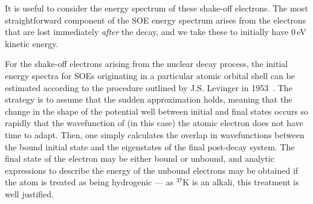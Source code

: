 It is useful to consider the energy spectrum of these shake-off electrons.  The most straightforward component of the SOE energy spectrum arises from the electrons that are lost immediately \emph{after} the decay, and we take these to initially have 0\,eV kinetic energy.  

For the shake-off electrons arising from the nuclear decay process, the initial energy spectra for SOEs originating in a particular atomic orbital shell can be estimated according to the procedure outlined by J.S. Levinger in 1953~\cite{Levinger}.
%
The strategy is to assume that the sudden approximation holds, meaning that the change in the shape of the potential well between initial and final states occurs so rapidly that the wavefunction of (in this case) the atomic electron does not have time to adapt.  Then, one simply calculates the overlap in wavefunctions between the bound initial state and the eigenstates of the final post-decay system.  The final state of the electron may be either bound or unbound, and analytic expressions to describe the energy of the unbound electrons may be obtained if the atom is treated as being hydrogenic --- as $^{37}\textrm{K}$ is an alkali, this treatment is well justified.
 
%

